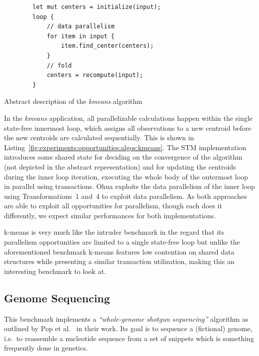 \begin{listing}
    \begin{verbatim}
        let mut centers = initialize(input);
        loop {
            // data parallelism
            for item in input {
                item.find_center(centers);
            }
            // fold
            centers = recompute(input);
        }
    \end{verbatim}
    \caption{Abstract description of the \emph{kmeans} algorithm}
    \label{fig:experiments:opportunities:algos:kmeans}
\end{listing}

In the \emph{kmeans} application, all parallelizable calculations happen within the single state-free innermost loop, which assigns all observations to a new centroid before the new centroids are calculated sequentially.
This is shown in Listing~\ref{fig:experiments:opportunities:algos:kmeans}.
The STM implementation introduces some shared state for deciding on the convergence of the algorithm (not depicted in the abstract representation) and for updating the centroids during the inner loop iteration, executing the whole body of the outermost loop in parallel using transactions.
Ohua exploits the data parallelism of the inner loop using Transformations~1 and~4 to exploit data parallelism.
As both approaches are able to exploit all opportunities for parallelism, though each does it differently, we expect similar performances for both implementations.

k-means is very much like the intruder benchmark in the regard that its parallelism opportunities are limited to a single state-free loop but unlike the aforementioned benchmark k-means features low contention on shared data structures while presenting a similar transaction utilization, making this an interesting benchmark to look at.

\subsection{Genome Sequencing}
\label{sec:experiments:genome}
This benchmark implements a \emph{\enquote{whole-genome shotgun sequencing}} algorithm as outlined by Pop et al.~\cite{pop2002genome} in their work.
Its goal is to sequence a (fictional) genome, i.e.\ to reassemble a nucleotide sequence from a set of snippets which is something frequently done in genetics.

